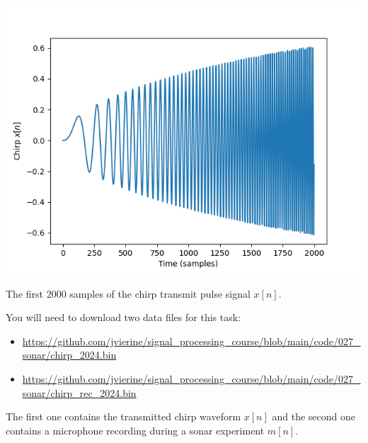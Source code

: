\begin{marginfigure}
  \begin{center}
    \includegraphics[width=\textwidth]{Assignments/figures/chirp_tx.png}
  \end{center}
  \caption{The first 2000 samples of the chirp transmit pulse signal
    $x[n]$.}
  \label{fig:tx_pulse_chirp}
\end{marginfigure}

You will need to download two data files for this task:
\begin{itemize}
  \item \url{https://github.com/jvierine/signal_processing_course/blob/main/code/027_sonar/chirp_2024.bin}
  \item \url{https://github.com/jvierine/signal_processing_course/blob/main/code/027_sonar/chirp_rec_2024.bin}
\end{itemize}
The first one contains the transmitted chirp waveform $x[n]$ and the
second one contains a microphone recording during a sonar experiment
$m[n]$.

